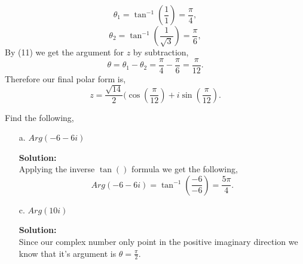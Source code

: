 \documentclass[12pt]{article}
\makeatletter
\theoremstyle{homework}
\newenvironment{exercise}[1]
{\def\@currentlabel{#1}\exercisecore}
{\endexercisecore}
\newcommand{\localhead}[1]{\par\smallskip\noindent\textbf{#1}\nobreak\\}%
\newcommand\solution{\localhead{Solution:}}
\makeatother
\begin{document}
\begin{exercise}{7}
\begin{enumerate}
        \begin{equation*}
            \theta_1 = \tan^{-1}(\frac{1}{1}) = \frac{\pi}{4},
        \end{equation*}
        \begin{equation*}
            \theta_2 = \tan^{-1}(\frac{1}{\sqrt{3}}) = \frac{\pi}{6},
        \end{equation*}
        By (11) we get the argument for $z$ by subtraction, 
        \begin{equation*}
            \theta = \theta_1 - \theta_2 = \frac{\pi}{4} - \frac{\pi}{6} = \frac{\pi}{12}.
        \end{equation*}
        Therefore our final polar form is, 
        \begin{equation*}
            z = \frac{\sqrt{14}}{2}(\cos(\frac{\pi}{12}) + i\sin(\frac{\pi}{12}).
        \end{equation*}
    \end{enumerate}
    
\end{exercise}
\vspace{.15in}




\begin{exercise}{12} Find the following, 
    \begin{enumerate}
        \item[a.] $Arg(-6-6i)$
        \solution Applying the inverse $\tan()$ formula we get the following, 
        \begin{equation*}
            Arg(-6-6i) = \tan^{-1}(\frac{-6}{-6}) = \frac{5\pi}{4}.
        \end{equation*}   
        \item[c.] $Arg(10i)$
        \solution Since our complex number only point in the positive imaginary direction we know that it's argument is $\theta = \frac{\pi}{2}$.  
    \end{enumerate}
\end{exercise}
\vspace{.15in}
\end{document}
